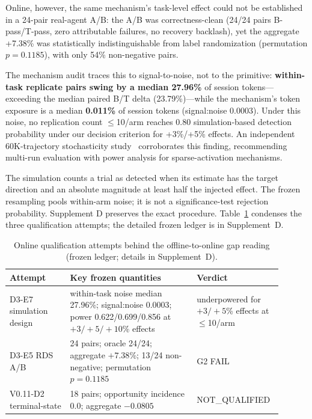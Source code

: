 ﻿\documentclass[sigconf,balance=false]{acmart}
\begin{document}
Online, however, the same mechanism's task-level effect could not be established in a 24-pair real-agent A/B: the A/B was correctness-clean (24/24 pairs B-pass/T-pass, zero attributable failures, no recovery backlash), yet the aggregate +7.38\% was statistically indistinguishable from label randomization (permutation $p = 0.1185$), with only 54\% non-negative pairs.

The mechanism audit traces this to signal-to-noise, not to the primitive: \textbf{within-task replicate pairs swing by a median 27.96\%} of session tokens---exceeding the median paired B/T delta (23.79\%)---while the mechanism's token exposure is a median \textbf{0.011\%} of session tokens (signal:noise 0.0003). Under this noise, no replication count $\leq$10/arm reaches 0.80 simulation-based detection probability under our decision criterion for +3\%/+5\% effects. An independent 60K-trajectory stochasticity study~\cite{randomness2026} corroborates this finding, recommending multi-run evaluation with power analysis for sparse-activation mechanisms.

The simulation counts a trial as detected when its estimate has the target direction and an absolute magnitude at least half the injected effect. The frozen resampling pools within-arm noise; it is not a significance-test rejection probability. Supplement D preserves the exact procedure. Table~\ref{tab:qualification} condenses the three qualification attempts; the detailed frozen ledger is in Supplement~D.

\begin{table}[t]
\centering
\caption{Online qualification attempts behind the offline-to-online gap reading (frozen ledger; details in Supplement~D).}
\label{tab:qualification}
\small
\begin{tabular}{@{}p{0.21\linewidth}p{0.44\linewidth}p{0.25\linewidth}@{}}
\toprule
\textbf{Attempt} & \textbf{Key frozen quantities} & \textbf{Verdict} \\
\midrule
D3-E7 simulation design & within-task noise median 27.96\%; signal:noise 0.0003; power 0.622/0.699/0.856 at $+3/+5/+10$\% effects & underpowered for $+3/+5$\% effects at $\leq$10/arm \\
D3-E5 RDS A/B & 24 pairs; oracle 24/24; aggregate $+7.38$\%; 13/24 non-negative; permutation $p = 0.1185$ & G2 FAIL \\
V0.11-D2 terminal-state & 18 pairs; opportunity incidence 0.0; aggregate $-0.0805$ & NOT\_QUALIFIED \\
\bottomrule
\end{tabular}
\end{table}
\end{document}
